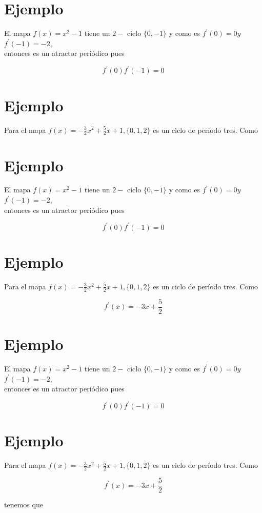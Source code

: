 \documentclass[11pt]{beamer}
\begin{document}
\section*{Ejemplo}
El mapa $f(x)=x^{2}-1$ tiene un $2-$ ciclo $\{0,-1\}$ y como es $f^{\prime}(0)=0 y$ $f^{\prime}(-1)=-2$,\\
entonces es un atractor periódico pues

$$
f^{\prime}(0) f^{\prime}(-1)=0
$$

\section*{Ejemplo}
Para el mapa $f(x)=-\frac{3}{2} x^{2}+\frac{5}{2} x+1,\{0,1,2\}$ es un ciclo de período tres. Como

\section*{Ejemplo}
El mapa $f(x)=x^{2}-1$ tiene un $2-$ ciclo $\{0,-1\}$ y como es $f^{\prime}(0)=0 y$ $f^{\prime}(-1)=-2$,\\
entonces es un atractor periódico pues

$$
f^{\prime}(0) f^{\prime}(-1)=0
$$

\section*{Ejemplo}
Para el mapa $f(x)=-\frac{3}{2} x^{2}+\frac{5}{2} x+1,\{0,1,2\}$ es un ciclo de período tres. Como

$$
f^{\prime}(x)=-3 x+\frac{5}{2}
$$

\section*{Ejemplo}
El mapa $f(x)=x^{2}-1$ tiene un $2-$ ciclo $\{0,-1\}$ y como es $f^{\prime}(0)=0 y$ $f^{\prime}(-1)=-2$,\\
entonces es un atractor periódico pues

$$
f^{\prime}(0) f^{\prime}(-1)=0
$$

\section*{Ejemplo}
Para el mapa $f(x)=-\frac{3}{2} x^{2}+\frac{5}{2} x+1,\{0,1,2\}$ es un ciclo de período tres. Como

$$
f^{\prime}(x)=-3 x+\frac{5}{2}
$$

tenemos que
\end{document}
